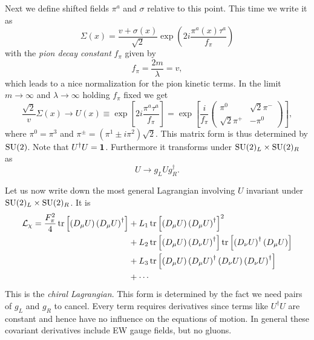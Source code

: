 Next we define shifted fields $\pi^a$ and $\sigma$ relative to this point.
This time we write it as
\begin{equation}
\Sigma(x)=\frac{v+\sigma(x)}{\sqrt{2}} \exp \left(2 i \frac{\pi^a(x) \tau^a}{f_\pi}\right)
\end{equation}
with the {\it pion decay constant} $f_\pi$ given by
\begin{equation}
f_\pi=\frac{2m}{\lambda}=v,
\end{equation}
which leads to a nice normalization for the pion kinetic terms.
In the limit $m\to\infty$ and $\lambda\to\infty$ holding $f_\pi$ fixed we get
\begin{equation}\label{eq:Udef}
\frac{\sqrt{2}}{v} \Sigma(x) \rightarrow U(x) \equiv \exp 
\left[2 i \frac{\pi^a \tau^a}{f_\pi}\right]=\exp \left[\frac{i}{f_\pi}
\left(\begin{array}{cc}
\pi^0 & \sqrt{2} \pi^{-} \\
\sqrt{2} \pi^{+} & -\pi^0
\end{array}\right)
\right],
\end{equation}
where $\pi^0=\pi^3$ and $\pi^\pm=(\pi^1\pm i\pi^2)\sqrt{2}$. This matrix form is
thus determined by $\operatorname{SU}(2)$. Note that $U^\dagger U={\mathbf 1}$. Furthermore it
transforms under $\operatorname{SU}(2)_L\times\operatorname{SU}(2)_R$ as
\begin{equation}
U\to g_LU g_R^\dagger.
\end{equation}

Let us now write down the most general Lagrangian involving $U$ invariant under 
$\operatorname{SU}(2)_L\times\operatorname{SU}(2)_R$. It is 
\begin{equation}\begin{aligned}\label{eq:chiralLagr}
\mathcal{L}_\chi=\frac{F_\pi^2}{4} \operatorname{tr}\left[\left(D_\mu U\right)\left(D_\mu U\right)^{\dagger}\right] & +L_1 \operatorname{tr}\left[\left(D_\mu U\right)\left(D_\mu U\right)^{\dagger}\right]^2 \\
&+L_2 \tr \left[\left(D_\mu U\right)\left(D_\nu U\right)^{\dagger}\right] \operatorname{tr}\left[\left(D_\nu U\right)^{\dagger}\left(D_\mu U\right)\right]  \\
& +L_3 \tr\left[\left(D_\mu U\right)\left(D_\mu
U\right)^{\dagger}\left(D_\nu U\right)\left(D_\nu U\right)^{\dagger}\right]\\
&+\cdots
\end{aligned}\end{equation}
This is the {\it chiral Lagrangian}. This form is
determined by the fact we need pairs of $g_L$ and $g_R$ to cancel. Every term
requires derivatives since terms like $U^\dagger U$ are constant and hence have
no influence on the equations of motion.
In general these covariant derivatives include EW gauge fields, but no gluons.

